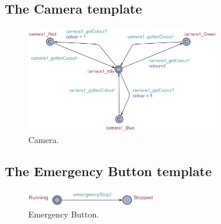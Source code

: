 \subsection{The Camera template}
\begin{figure}[H]
    \centering
    \includegraphics[width=0.75\textwidth]{Image/uppaal-templates/camera1.png}
    \caption{Camera.}
    \label{fig:camera}
\end{figure}

\subsection{The Emergency Button template}
\begin{figure}[H]
    \centering
    \includegraphics[width=0.5\textwidth]{Image/uppaal-templates/EmergencyButton.png}
    \caption{Emergency Button.}
    \label{fig:emergency_button}
\end{figure}





